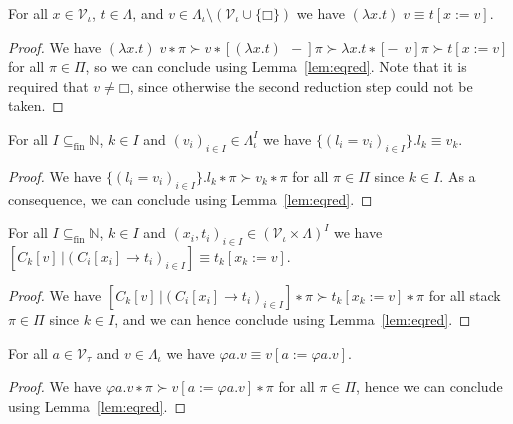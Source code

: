 \begin{theorem}
  For all $x ∈ \mathcal{V}_{ι}$, $t ∈ Λ$, and $v ∈ Λ_{ι} \setminus
  (\mathcal{V}_{ι} ∪ \{□\})$ we have $(λx.t)\;v ≡ t[x := v]$.
\end{theorem}
\begin{proof}
  We have ${(λx.t)\;v ∗ π} ≻ {v ∗ [(λx.t)\;\,{-}]π} ≻ {λx.t ∗ [{-}\;\,v]π} ≻
  t[x := v]$ for all $π ∈ Π$, so we can conclude using Lemma~\ref{lem:eqred}.
  Note that it is required that $v ≠ □$, since otherwise the second reduction
  step could not be taken.
\end{proof}

\begin{theorem}
  For all $I ⊆_{\text{fin}} \mathbb{N}$, $k ∈ I$ and $(v_i)_{i∈I} ∈ Λ_{ι}^I$ 
  we have $\{(l_i = v_i)_{i∈I}\}.l_k ≡ v_k$.
\end{theorem}
\begin{proof}
  We have ${\{(l_i = v_i)_{i∈I}\}.l_k ∗ π} ≻ {v_k ∗ π}$ for all $π ∈ Π$ since
  $k ∈ I$. As a consequence, we can conclude using Lemma~\ref{lem:eqred}.
\end{proof}

\begin{theorem}
  For all $I ⊆_{\text{fin}} \mathbb{N}$, $k ∈ I$ and $(x_i, t_i)_{i ∈ I} ∈
  (\mathcal{V}_{ι} × Λ)^I$ we have  $[C_k[v]\,| (C_i[x_i] → t_i)_{i∈I}] ≡
  t_k[x_k := v]$.
\end{theorem}
\begin{proof}
  We have ${[C_k[v]\,| (C_i[x_i] → t_i)_{i∈I}] ∗ π} ≻ {t_k[x_k := v] ∗ π}$
  for all stack $π ∈ Π$ since $k ∈ I$, and we can hence conclude using
  Lemma~\ref{lem:eqred}.
\end{proof}

\begin{theorem}
  For all $a ∈ \mathcal{V}_{τ}$ and $v ∈ Λ_{ι}$ we have
  ${φa.v} ≡ {v[a := φa.v]}$.
\end{theorem}
\begin{proof}
  We have ${φa.v ∗ π} ≻ {v[a := φa.v] ∗ π}$ for all $π ∈ Π$, hence we can
  conclude using Lemma~\ref{lem:eqred}.
\end{proof}

